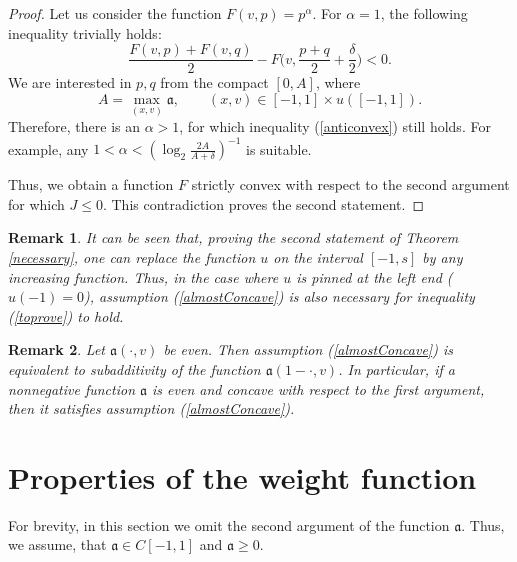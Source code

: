 \documentclass[12pt]{article}
\renewcommand{\ge}{\geqslant}
\renewcommand{\le}{\leqslant}
\newtheorem{rem}{Remark}
\begin{document}
\begin{proof}
Let us consider the function $F(v, p) = p ^ \alpha$.
For $\alpha = 1$, the following inequality trivially holds:
\begin{equation}
\label{anticonvex}
\frac{F(v, p) + F(v, q)}{ 2 } - F\big(v, \frac{p + q}{ 2 } + \frac{\delta}{ 2 }\big) <0.
\end{equation}
We are interested in $p, q$ from the compact $[0 , A]$,
where 
\begin{equation}
\label{weightMax}
A=\max \limits_{(x, v)} \mathfrak a,\qquad (x, v) \in [-1, 1 ] \times u([-1, 1] ).
\end{equation}
Therefore, there is an $\alpha> 1$, for which inequality (\ref{anticonvex})
still holds.
For example, any $1 < \alpha < (\log_2 \frac{ 2 A}{A + \delta})^{-1}$ is suitable.

Thus, we obtain a function $F$ strictly convex with respect to the second argument
for which $J \le 0$. This contradiction proves the second statement.
\end{proof}

\begin{rem}
\label{landesNecessary}
It can be seen that, proving the second statement of Theorem \ref{necessary},
one can replace the function $u$ on the interval $[-1, s]$ by any increasing function.
Thus, in the case where $u$ is pinned at the left end {\rm ($u(-1) = 0$)},
assumption (\ref{almostConcave}) is also necessary for inequality (\ref{toprove}) to hold.
\end{rem}

\begin{rem}
Let $\mathfrak a(\cdot, v)$ be even.
Then assumption (\ref{almostConcave}) is equivalent to subadditivity of the function $\mathfrak a(1 - \cdot, v)$.
In particular, if a nonnegative function $\mathfrak a$ is even and concave with respect to the first argument, then it satisfies assumption (\ref{almostConcave}).
\end{rem}

\section{Properties of the weight function}

For brevity, in this section we omit the second argument of the function $\mathfrak a$.
Thus, we assume, that $\mathfrak a \in C[-1, 1]$ and $\mathfrak a \ge 0$.
\end{document}
